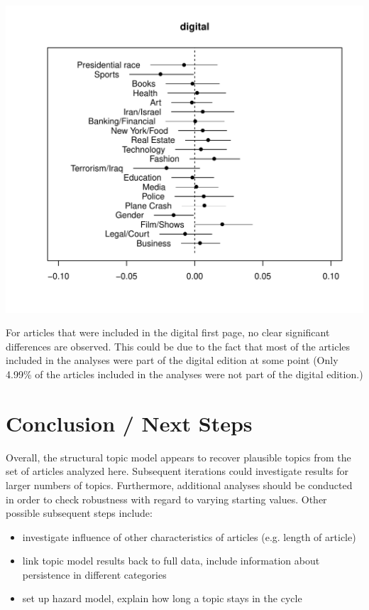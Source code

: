 \documentclass[12pt]{article}\usepackage[]{graphicx}\usepackage[]{color}
\makeatletter
\def\maxwidth{ %
  \ifdim\Gin@nat@width>\linewidth
    \linewidth
  \else
    \Gin@nat@width
  \fi
}
\newenvironment{knitrout}{}{} %
\makeatother
\begin{document}
\clearpage
\begin{knitrout}
\color{fgcolor}
\includegraphics[width=\maxwidth]{figure/unnamed-chunk-12-1} 

\end{knitrout}
For articles that were included in the digital first page, no clear significant differences are observed. This could be due to the fact that most of the articles included in the analyses were part of the digital edition at some point (Only 4.99\% of the articles included in the analyses were not part of the digital edition.)

\clearpage
\section{Conclusion / Next Steps}
Overall, the structural topic model appears to recover plausible topics from the set of articles analyzed here. Subsequent iterations could investigate results for larger numbers of topics. Furthermore, additional analyses should be conducted in order to check robustness with regard to varying starting values. Other possible subsequent steps include:
\begin{itemize}
  \item investigate influence of other characteristics of articles (e.g. length of article)
  \item link topic model results back to full data, include information about persistence in different categories
  \item set up hazard model, explain how long a topic stays in the cycle
\end{itemize}




\end{document}
